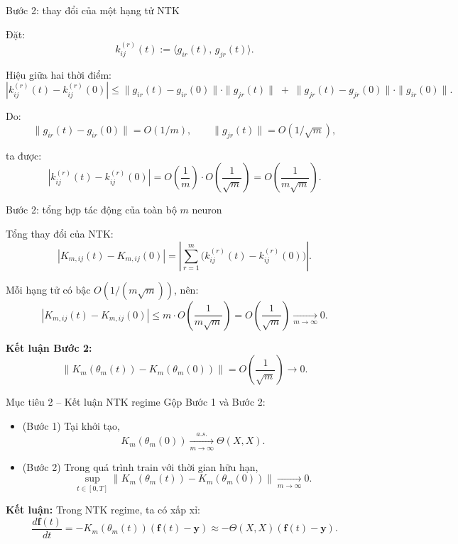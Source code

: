\documentclass[12pt]{beamer}
\begin{document}
\begin{frame}{Bước 2: thay đổi của một hạng tử NTK}

Đặt:
\[
  k_{ij}^{(r)}(t) := \langle g_{ir}(t),\, g_{jr}(t)\rangle.
\]

Hiệu giữa hai thời điểm:
\[
  |k_{ij}^{(r)}(t) - k_{ij}^{(r)}(0)|
  \le
  \|g_{ir}(t)-g_{ir}(0)\|\cdot \|g_{jr}(t)\|
  \;+\;
  \|g_{jr}(t)-g_{jr}(0)\|\cdot \|g_{ir}(0)\|.
\]

Do:
\[
  \|g_{ir}(t)-g_{ir}(0)\| = O(1/m), \qquad
  \|g_{jr}(t)\| = O(1/\sqrt{m}),
\]

ta được:
\[
  |k_{ij}^{(r)}(t) - k_{ij}^{(r)}(0)|
  = O\!\left(\frac{1}{m}\right)
    \cdot O\!\left(\frac{1}{\sqrt{m}}\right)
  = O\!\left(\frac{1}{m\sqrt{m}}\right).
\]

\end{frame}
\begin{frame}{Bước 2: tổng hợp tác động của toàn bộ $m$ neuron}

Tổng thay đổi của NTK:
\[
  |K_{m,ij}(t) - K_{m,ij}(0)|
  = \left|\sum_{r=1}^m \big(k_{ij}^{(r)}(t) - k_{ij}^{(r)}(0)\big)\right|.
\]

Mỗi hạng tử có bậc $O(1/(m\sqrt{m}))$, nên:
\[
  |K_{m,ij}(t) - K_{m,ij}(0)|
  \le
  m \cdot O\!\left(\frac{1}{m\sqrt{m}}\right)
  = O\!\left(\frac{1}{\sqrt{m}}\right)
  \xrightarrow[m\to\infty]{}
  0.
\]

\textbf{Kết luận Bước 2:}
\[
  \|K_m(\theta_m(t)) - K_m(\theta_m(0))\|
  = O\!\left(\frac{1}{\sqrt{m}}\right)
  \to 0.
\]

\end{frame}


\begin{frame}{Mục tiêu 2 – Kết luận NTK regime}
  Gộp Bước 1 và Bước 2:
  \begin{itemize}
    \item (Bước 1) Tại khởi tạo,
      \[
        K_m(\theta_m(0)) \xrightarrow[m\to\infty]{a.s.} \Theta(X,X).
      \]
    \item (Bước 2) Trong quá trình train với thời gian hữu hạn,
      \[
        \sup_{t\in[0,T]}
        \|K_m(\theta_m(t)) - K_m(\theta_m(0))\|
        \xrightarrow[m\to\infty]{} 0.
      \]
  \end{itemize}

  \vspace{0.2cm}
  \textbf{Kết luận:} Trong NTK regime, ta có xấp xỉ:
  \[
    \frac{d\mathbf f(t)}{dt}
      = -K_m(\theta_m(t))(\mathbf f(t)-\mathbf y)
      \approx -\Theta(X,X)(\mathbf f(t)-\mathbf y).
  \]

\end{frame}
\end{document}
